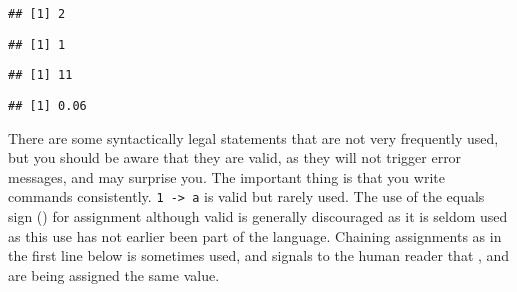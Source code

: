 \documentclass[paper=a4,headsepline,BCOR=12mm,twoside,open=right,%
titlepage,headings=small,fontsize=10pt,index=totoc,bibliography=totoc,%
captions=tableheading,captions=nooneline]{scrbook}\usepackage{knitr}
\begin{document}
\begin{knitrout}\footnotesize
{}\color{fgcolor}\begin{kframe}
\begin{alltt}
 \hlkwb{<-} 
 \hlopt{+} 
\end{alltt}
\begin{verbatim}
## [1] 2
\end{verbatim}
\begin{alltt}
\end{alltt}
\begin{verbatim}
## [1] 1
\end{verbatim}
\begin{alltt}
 \hlkwb{<-} 
 \hlkwb{<-}  \hlopt{+} 
\end{alltt}
\begin{verbatim}
## [1] 11
\end{verbatim}
\begin{alltt}
 \hlopt{*} 
\end{alltt}
\begin{verbatim}
## [1] 0.06
\end{verbatim}
\end{kframe}
\end{knitrout}

There are some syntactically legal statements that are not very frequently used, but you should be aware that they are valid, as they will not trigger error messages, and may surprise you. The important thing is that you write commands consistently. \texttt{1 -> a} is valid but rarely used. The use of the equals sign (\code{=}) for assignment although valid is generally discouraged as it is seldom used as this use has not earlier been part of the \R language. Chaining assignments as in the first line below is sometimes used, and signals to the human reader that ,  and  are being assigned the same value.
\end{document}
